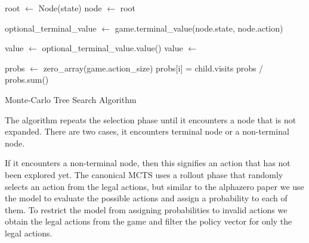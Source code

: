 \begin{algorithm}[htb]
    \begin{algorithmic}[1]
            \State root $\gets$ Node(state)
                \State node $\gets$ root
        
        
                \State optional\_terminal\_value $\gets$ game.terminal\_value(node.state, node.action)
                
                    \State value $\gets$ optional\_terminal\_value.value()
                \Else
                    \State value $\gets$ 
                \EndIf
        
                \State {}
            \EndFor

            \State probs $\gets$ zero\_array(game.action\_size)
                \State probs[i] = child.visits
            \EndFor
            \State \Return probs / probs.sum()
        \EndFunction
    \end{algorithmic}
    \caption{Monte-Carlo Tree Search Algorithm}
    \label{alg:mcts}
\end{algorithm}

The algorithm repeats the selection phase until it encounters a node that is not expanded. There are two cases, it encounters terminal node or a non-terminal node. 

If it encounters a non-terminal node, then this signifies an action that has not been explored yet. The canonical MCTS uses a rollout phase that randomly selects an action from the legal actions, but similar to the alphazero paper we use the model to evaluate the possible actions and assign a probability to each of them. To restrict the model from assigning probabilities to invalid actions we obtain the legal actions from the game and filter the policy vector for only the legal actions.

